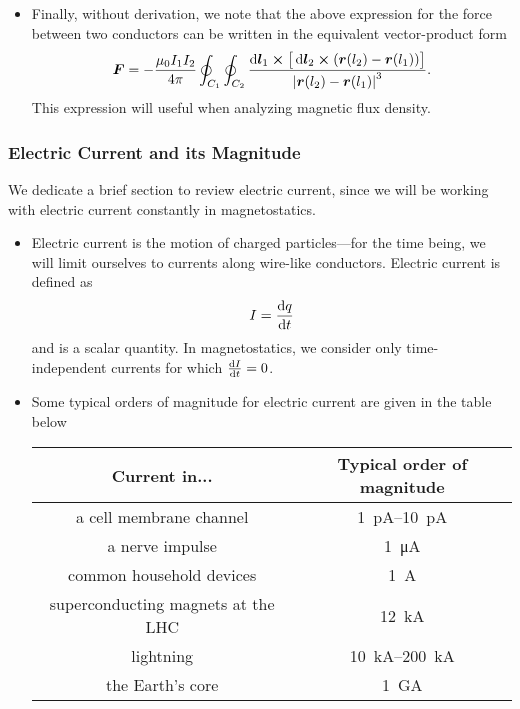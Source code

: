 \documentclass[11pt, a4paper]{article}
\newcommand{\diff}{\mathop{}\!\mathrm{d}} %
\renewcommand{\vec}[1]{\bm{#1}} %
\renewcommand{\r}{\vec{r}}
\newcommand{\mm}{\mu_{0}}  %
\begin{document}
\begin{itemize}
	\item Finally, without derivation, we note that the above expression for the force between two conductors can be written in the equivalent vector-product form
	\begin{equation*}
		\vec{F} = - \frac{\mm I_{1}I_{2}}{4\pi}\oint_{C_{1}}\oint_{C_{2}} \frac{\diff \vec{l}_{1}\cross \big[\diff \vec{l}_{2} \cross (\r(l_{2}) - \r(l_{1}) )\big]}{\abs{\r(l_{2}) - \r(l_{1})}^{3}}.
	\end{equation*}
    This expression will useful when analyzing magnetic flux density.
	
\end{itemize}

\subsubsection{Electric Current and its Magnitude}
We dedicate a brief section to review electric current, since we will be working with electric current constantly in magnetostatics. 
\begin{itemize}
	\item Electric current is the motion of charged particles---for the time being, we will limit ourselves to currents along wire-like conductors. Electric current is defined as
	\begin{equation*}
		I = \dv{q}{t}
	\end{equation*}
    and is a scalar quantity. In magnetostatics, we consider only time-independent currents for which $ \dv{I}{t} = 0 $.
	
	\item Some typical orders of magnitude for electric current are given in the table below
	
	\begin{center}
	\begin{tabular} {c|c}
        Current in... & Typical order of magnitude \\
        \hline
        a cell membrane channel &  \SIrange{1}{10}{\pico \ampere} \\
        a nerve impulse &  \SI{1}{\micro \ampere}  \\
        common household devices &  \SI{1}{\ampere} \\
        superconducting magnets at the LHC & \SI{12}{\kilo \ampere} \\
        lightning &  \SIrange{10}{200}{\kilo \ampere} \\
        the Earth's core &  \SI{1}{\giga \ampere} 
	\end{tabular}
	\end{center}
	
\end{itemize}
\end{document}
